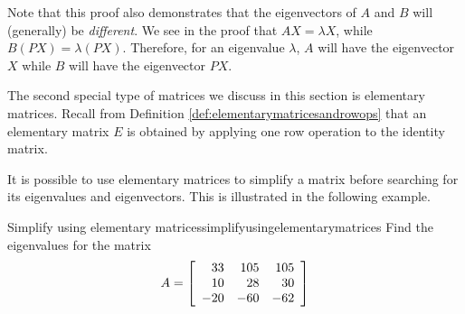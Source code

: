 Note that this proof also demonstrates that the eigenvectors of $A$ and $B$ will (generally) be {\em different\em}.
We see in the proof that $AX = \lambda X$, while $B \left(PX\right)=\lambda \left(PX\right)$. Therefore,
for an eigenvalue $\lambda$, $A$ will have the eigenvector $X$ while $B$ will have the eigenvector $PX$. 


The second special type of matrices we discuss in this section is elementary matrices.  
Recall from Definition \ref{def:elementarymatricesandrowops} that an elementary matrix $E$ is obtained by applying
one row operation to the identity matrix. 

It is possible to use elementary matrices to simplify a matrix before searching for its
eigenvalues and eigenvectors. This is illustrated in the following
example.

\begin{example}{Simplify using elementary matrices}{simplifyusingelementarymatrices}
Find the eigenvalues for the matrix
\begin{equation*}
A = \left[
\begin{array}{rrr}
 33 & 105 & 105 \\
 10 &  28 & 30 \\
-20 & -60 & -62
\end{array}
\right]
\end{equation*}
\end{example}

